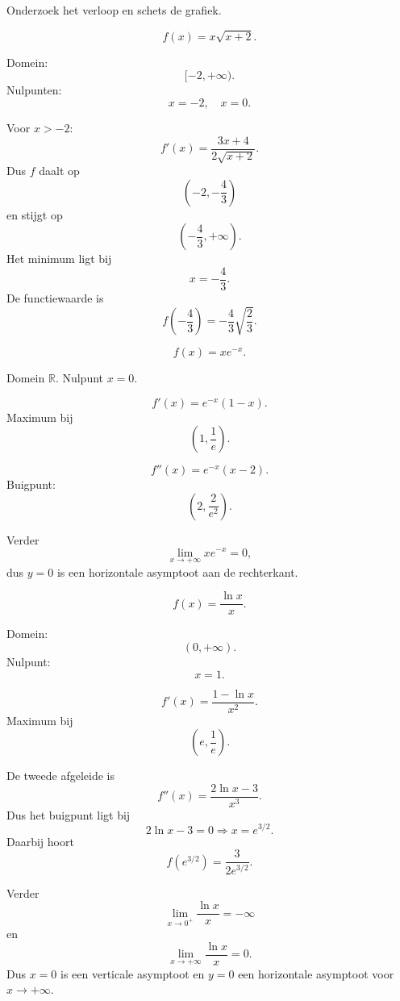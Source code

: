 \documentclass{ximera}
\begin{document}
\begin{oefening}{\oefU\ESS}
Onderzoek het verloop en schets de grafiek.

\begin{question}
\[
f(x)=x\sqrt{x+2}.
\]
\begin{oplossing}
Domein:
\[
[-2,+\infty).
\]
Nulpunten:
\[
x=-2,\quad x=0.
\]

Voor \(x>-2\):
\[
f'(x)=\frac{3x+4}{2\sqrt{x+2}}.
\]
Dus \(f\) daalt op
\[
\left(-2,-\frac43\right)
\]
en stijgt op
\[
\left(-\frac43,+\infty\right).
\]
Het minimum ligt bij
\[
x=-\frac43.
\]
De functiewaarde is
\[
f\left(-\frac43\right)
=
-\frac43\sqrt{\frac23}.
\]
\end{oplossing}
\end{question}

\begin{question}
\[
f(x)=x e^{-x}.
\]
\begin{oplossing}
Domein \(\mathbb{R}\). Nulpunt \(x=0\).

\[
f'(x)=e^{-x}(1-x).
\]
Maximum bij
\[
\left(1,\frac1e\right).
\]

\[
f''(x)=e^{-x}(x-2).
\]
Buigpunt:
\[
\left(2,\frac2{e^2}\right).
\]

Verder
\[
\lim_{x\to+\infty}xe^{-x}=0,
\]
dus \(y=0\) is een horizontale asymptoot aan de rechterkant.
\end{oplossing}
\end{question}

\begin{question}
\[
f(x)=\frac{\ln x}{x}.
\]
\begin{oplossing}
Domein:
\[
(0,+\infty).
\]
Nulpunt:
\[
x=1.
\]

\[
f'(x)=\frac{1-\ln x}{x^2}.
\]
Maximum bij
\[
\left(e,\frac1e\right).
\]

De tweede afgeleide is
\[
f''(x)=\frac{2\ln x-3}{x^3}.
\]
Dus het buigpunt ligt bij
\[
2\ln x-3=0
\Longrightarrow
x=e^{3/2}.
\]
Daarbij hoort
\[
f(e^{3/2})=\frac{3}{2e^{3/2}}.
\]

Verder
\[
\lim_{x\to0^+}\frac{\ln x}{x}=-\infty
\]
en
\[
\lim_{x\to+\infty}\frac{\ln x}{x}=0.
\]
Dus \(x=0\) is een verticale asymptoot en \(y=0\) een horizontale
asymptoot voor \(x\to+\infty\).
\end{oplossing}
\end{question}
\end{oefening}

\end{document}
